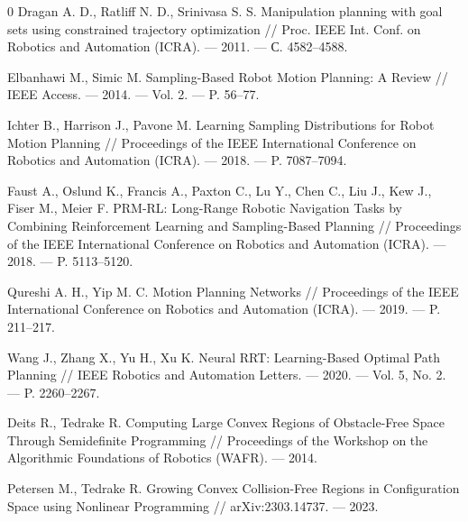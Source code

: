 \documentclass[a4paper,12pt]{extarticle}
\begin{document}
\begin{thebibliography}{0}
\hypertarget{dragan2011}{}
Dragan A. D., Ratliff N. D., Srinivasa S. S.
Manipulation planning with goal sets using constrained trajectory
optimization //
Proc. IEEE Int. Conf. on Robotics and Automation (ICRA). — 2011. —
С. 4582--4588.

\hypertarget{elbanhawi2014}{}
Elbanhawi M., Simic M.
Sampling-Based Robot Motion Planning: A Review //
IEEE Access. — 2014. — Vol. 2. — P. 56--77.

\hypertarget{ichter2018}{}
Ichter B., Harrison J., Pavone M.
Learning Sampling Distributions for Robot Motion Planning //
Proceedings of the IEEE International Conference on Robotics and
Automation (ICRA). — 2018. — P. 7087--7094.

\hypertarget{faust2018}{}
Faust A., Oslund K., Francis A., Paxton C., Lu Y., Chen C.,
Liu J., Kew J., Fiser M., Meier F.
PRM-RL: Long-Range Robotic Navigation Tasks by Combining Reinforcement
Learning and Sampling-Based Planning //
Proceedings of the IEEE International Conference on Robotics and
Automation (ICRA). — 2018. — P. 5113--5120.

\hypertarget{qureshi2019}{}
Qureshi A. H., Yip M. C.
Motion Planning Networks //
Proceedings of the IEEE International Conference on Robotics and
Automation (ICRA). — 2019. — P. 211--217.

\hypertarget{wang2020}{}
Wang J., Zhang X., Yu H., Xu K.
Neural RRT: Learning-Based Optimal Path Planning //
IEEE Robotics and Automation Letters. — 2020. —
Vol. 5, No. 2. — P. 2260--2267.

\hypertarget{deits2014}{}
Deits R., Tedrake R.
Computing Large Convex Regions of Obstacle-Free Space Through
Semidefinite Programming //
Proceedings of the Workshop on the Algorithmic Foundations of
Robotics (WAFR). — 2014.

\hypertarget{petersen2023}{}
Petersen M., Tedrake R.
Growing Convex Collision-Free Regions in Configuration Space using
Nonlinear Programming //
arXiv:2303.14737. — 2023.





\end{thebibliography}

	

	
\end{document}
